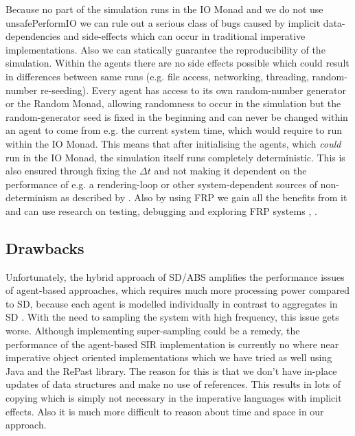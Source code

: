 Because no part of the simulation runs in the IO Monad and we do not use unsafePerformIO we can rule out a serious class of bugs caused by implicit data-dependencies and side-effects which can occur in traditional imperative implementations. Also we can statically guarantee the reproducibility of the simulation. Within the agents there are no side effects possible which could result in differences between same runs (e.g. file access, networking, threading, random-number re-seeding). Every agent has access to its own random-number generator or the Random Monad, allowing randomness to occur in the simulation but the random-generator seed is fixed in the beginning and can never be changed within an agent to come from e.g. the current system time, which would require to run within the IO Monad. This means that after initialising the agents, which \textit{could} run in the IO Monad, the simulation itself runs completely deterministic. This is also ensured through fixing the $\Delta t$ and not making it dependent on the performance of e.g. a rendering-loop or other system-dependent sources of non-determinism as described by \cite{perez_testing_2017}. Also by using FRP we gain all the benefits from it and can use research on testing, debugging and exploring FRP systems \cite{perez_testing_2017}, \cite{perez_back_2017}.

\subsection{Drawbacks}
Unfortunately, the hybrid approach of SD/ABS amplifies the performance issues of agent-based approaches, which requires much more processing power compared to SD, because each agent is modelled individually in contrast to aggregates in SD \cite{macal_agent-based_2010}. With the need to sampling the system with high frequency, this issue gets worse. Although implementing super-sampling could be a remedy, the performance of the agent-based SIR implementation is currently no where near imperative object oriented implementations which we have tried as well using Java and the RePast library. The reason for this is that we don't have in-place updates of data structures and make no use of references. This results in lots of copying which is simply not necessary in the imperative languages with implicit effects. Also it is much more difficult to reason about time and space in our approach. 

